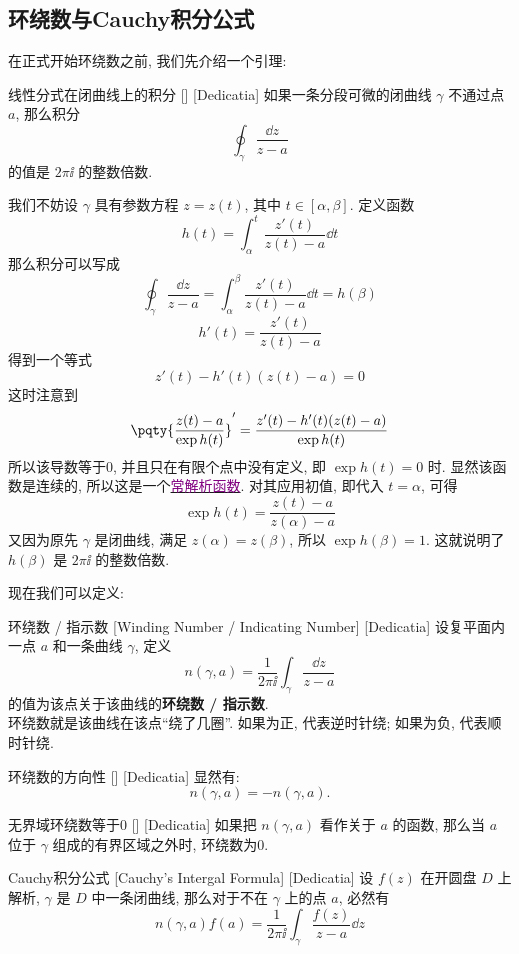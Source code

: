 \documentclass[UTF8]{ctexart}
\newcommand{\hyperrefc}[2]{\hyperref[#1]{\textcolor{purple}{#2}}}
\begin{document}
\subsection{环绕数与Cauchy积分公式}
在正式开始环绕数之前, 我们先介绍一个引理:
\begin{lma}
    [UUID]
    {线性分式在闭曲线上的积分}
    []
    [Dedicatia]
    如果一条分段可微的闭曲线 \( \gamma \) 不通过点 \( a \), 那么积分
    \[\oint_\gamma\frac{\dd{z}}{z-a} \]
    的值是 \( 2\pi\ii \) 的整数倍数. 
\end{lma}
\begin{prf}
    我们不妨设 \( \gamma \) 具有参数方程 \( z=z(t) \), 其中 \( t\in[\alpha,\beta] \). 定义函数
    \[h(t)=\int_\alpha^t \frac{z'(t)}{z(t)-a}\dd{t}\]
    那么积分可以写成
    \[\oint_\gamma\frac{\dd{z}}{z-a}=\int_\alpha^\beta \frac{z'(t)}{z(t)-a}\dd{t}=h(\beta)\]
    \[h'(t)=\frac{z'(t)}{z(t)-a}\]
    得到一个等式
    \[z'(t)-h'(t)(z(t)-a)=0\]
    这时注意到
    \[\pqty{\frac{z(t)-a}{\exp h(t)}}'=\frac{z'(t)-h'(t)(z(t)-a)}{\exp h(t)}\]
    所以该导数等于0, 并且只在有限个点中没有定义, 即 \( \exp h(t)=0 \) 时. 显然该函数是连续的, 所以这是一个\hyperrefc{ppt:TrivialAnalyticalFunction}{常解析函数}. 对其应用初值, 即代入 \( t=\alpha \), 可得
    \[\exp h(t)=\frac{z(t)-a}{z(\alpha)-a}\]
    又因为原先 \( \gamma \) 是闭曲线, 满足 \( z(\alpha)=z(\beta) \), 所以 \( \exp h(\beta)=1 \). 这就说明了 \( h(\beta) \) 是 \( 2\pi\ii \) 的整数倍数. 
\end{prf}
现在我们可以定义: 
\begin{dfn}
    [WindingNumber]
    {环绕数 / 指示数}
    [Winding Number / Indicating Number]
    [Dedicatia]
    设复平面内一点 \( a \) 和一条曲线 \( \gamma \), 定义
    \[n(\gamma, a)=\frac{1}{2\pi\ii}\int_\gamma\frac{\dd{z}}{z-a}\]
    的值为该点关于该曲线的\textbf{环绕数 / 指示数}.\\
    环绕数就是该曲线在该点“绕了几圈”. 如果为正, 代表逆时针绕; 如果为负, 代表顺时针绕. 
\end{dfn}
\begin{ppt}
    [UUID]
    {环绕数的方向性}
    []
    [Dedicatia]
    显然有: 
    \[n(\gamma,a)=-n(\gamma,a).\]
\end{ppt}
\begin{ppt}
    [UUID]
    {无界域环绕数等于0}
    []
    [Dedicatia]
    如果把 \( n(\gamma,a) \) 看作关于 \( a \) 的函数, 那么当 \( a \) 位于 \( \gamma \) 组成的有界区域之外时, 环绕数为0.
\end{ppt}
\begin{thm}
    [UUID]
    {Cauchy积分公式}
    [Cauchy's Intergal Formula]
    [Dedicatia]
    设 \( f(z) \) 在开圆盘 \( D \) 上解析,  \( \gamma \) 是 \( D \) 中一条闭曲线, 那么对于不在 \( \gamma \) 上的点 \( a \), 必然有
    \[n(\gamma,a)f(a)=\frac{1}{2\pi\ii}\int_\gamma\frac{f(z)}{z-a}\dd{z} \]
\end{thm}
\end{document}
